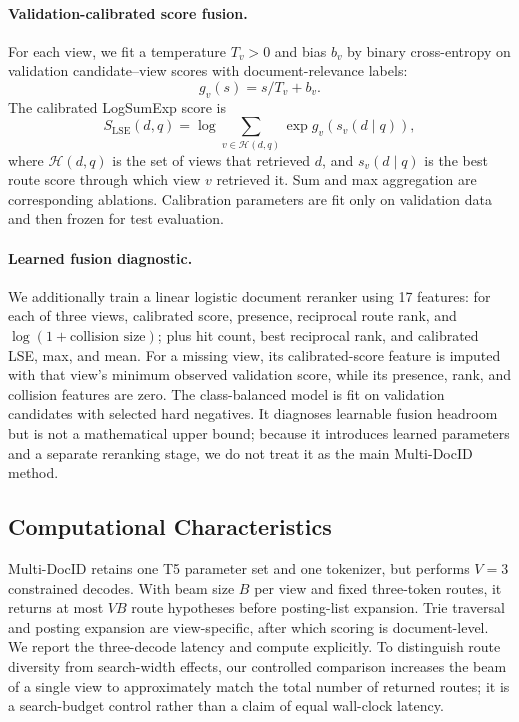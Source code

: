 \paragraph{Validation-calibrated score fusion.}
For each view, we fit a temperature $T_v>0$ and bias $b_v$ by binary cross-entropy on validation candidate--view scores with document-relevance labels:
\begin{equation}
    g_v(s)=s/T_v+b_v.
\end{equation}
The calibrated LogSumExp score is
\begin{equation}
    S_{\mathrm{LSE}}(d,q)
    =\log\sum_{v\in\mathcal{H}(d,q)}
      \exp g_v(s_v(d\mid q)),
\end{equation}
where $\mathcal{H}(d,q)$ is the set of views that retrieved $d$, and $s_v(d\mid q)$ is the best route score through which view $v$ retrieved it. Sum and max aggregation are corresponding ablations. Calibration parameters are fit only on validation data and then frozen for test evaluation.

\paragraph{Learned fusion diagnostic.}
We additionally train a linear logistic document reranker using 17 features: for each of three views, calibrated score, presence, reciprocal route rank, and $\log(1+\text{collision size})$; plus hit count, best reciprocal rank, and calibrated LSE, max, and mean. For a missing view, its calibrated-score feature is imputed with that view's minimum observed validation score, while its presence, rank, and collision features are zero. The class-balanced model is fit on validation candidates with selected hard negatives. It diagnoses learnable fusion headroom but is not a mathematical upper bound; because it introduces learned parameters and a separate reranking stage, we do not treat it as the main Multi-DocID method.

\subsection{Computational Characteristics}
\label{sec:complexity}

Multi-DocID retains one T5 parameter set and one tokenizer, but performs $V=3$ constrained decodes. With beam size $B$ per view and fixed three-token routes, it returns at most $VB$ route hypotheses before posting-list expansion. Trie traversal and posting expansion are view-specific, after which scoring is document-level. We report the three-decode latency and compute explicitly. To distinguish route diversity from search-width effects, our controlled comparison increases the beam of a single view to approximately match the total number of returned routes; it is a search-budget control rather than a claim of equal wall-clock latency.

